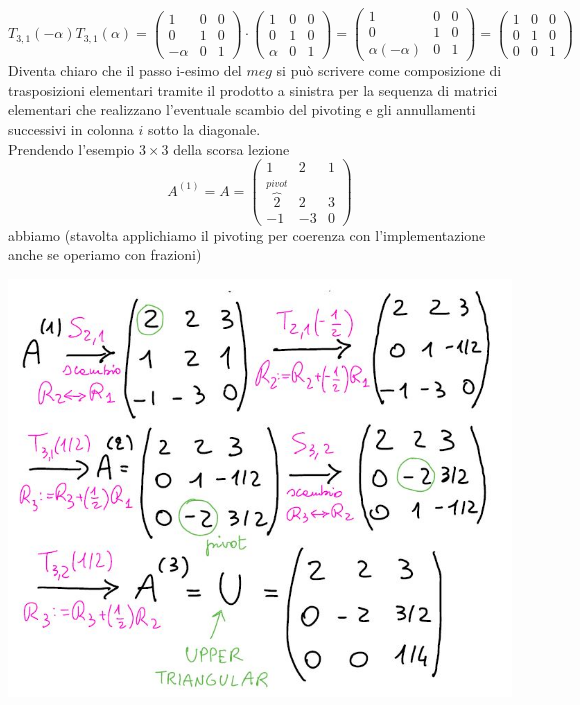 \documentclass[12pt,a4paper]{article}
\begin{document}
\begin{equation*}
    T_{3,1}(-\alpha)T_{3,1}(\alpha)=
    \begin{pmatrix}
        1 & 0 & 0 \\
        0 & 1 & 0 \\
        -\alpha & 0 & 1
    \end{pmatrix} \cdot \begin{pmatrix}
        1 & 0 & 0 \\
        0 & 1 & 0 \\
        \alpha & 0 & 1
    \end{pmatrix}=\begin{pmatrix}
        1 & 0 & 0 \\
        0 & 1 & 0 \\
        \alpha(-\alpha) & 0 & 1
    \end{pmatrix}=\begin{pmatrix}
        1 & 0 & 0 \\
        0 & 1 & 0 \\
        0 & 0 & 1
    \end{pmatrix}
\end{equation*}
Diventa chiaro che il passo i-esimo del $meg$ si può scrivere come composizione di trasposizioni elementari tramite il prodotto a sinistra per la sequenza di matrici elementari che realizzano l'eventuale scambio del pivoting e gli annullamenti successivi in colonna $i$ sotto la diagonale.\\Prendendo l'esempio $3\times 3$ della scorsa lezione
\begin{equation*}
    A^{(1)}=A=\begin{pmatrix}
        1 & 2 & 1 \\
        \overbrace{2}^{pivot} & 2 & 3 \\
        -1 & -3 & 0
        \end{pmatrix}
\end{equation*}
abbiamo (stavolta applichiamo il pivoting per coerenza con l'implementazione anche se operiamo con frazioni)
\begin{center}
    \includegraphics[scale=0.5]{calcolo1.JPG}    
\end{center}
\end{document}
